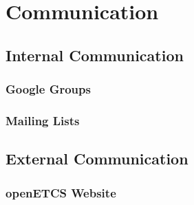 ﻿\section{Communication}

\subsection{Internal Communication}

\subsubsection{Google Groups}

\subsubsection{Mailing Lists}

\subsection{External Communication}

\subsubsection{openETCS Website}